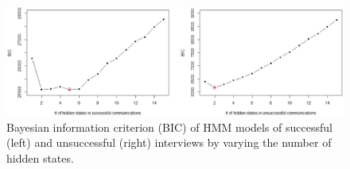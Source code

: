 \begin{figure}
  \includegraphics[width=1.0\textwidth]{figures/bic-vs-hidden-states.eps}
\caption{Bayesian information criterion (BIC) of HMM models of successful (left) and unsuccessful (right) interviews by varying the number of hidden states.}
\label{fig:bic}       %
\end{figure}

